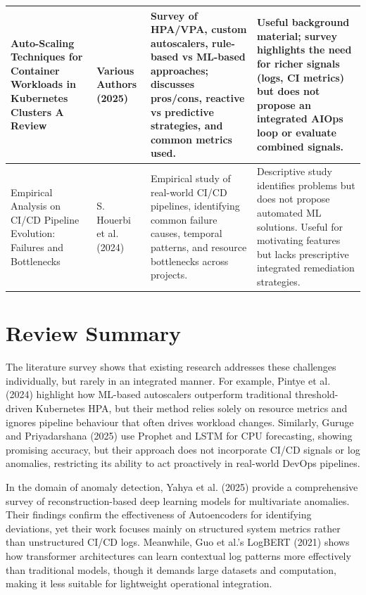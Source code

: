 \documentclass[12pt]{report}
\begin{document}
\begin{longtable}{|p{3.9cm}|p{2.9cm}|p{4.0cm}|p{3.4cm}|}
Auto-Scaling Techniques for Container Workloads in Kubernetes Clusters A Review &
Various Authors (2025) &
Survey of HPA/VPA, custom autoscalers, rule-based vs ML-based approaches; discusses pros/cons, reactive vs predictive strategies, and common metrics used. &
Useful background material; survey highlights the need for richer signals (logs, CI metrics) but does not propose an integrated AIOps loop or evaluate combined signals. \\
\hline

Empirical Analysis on CI/CD Pipeline Evolution: Failures and Bottlenecks &
S. Houerbi et al. (2024) &
Empirical study of real-world CI/CD pipelines, identifying common failure causes, temporal patterns, and resource bottlenecks across projects. &
Descriptive study identifies problems but does not propose automated ML solutions. Useful for motivating features but lacks prescriptive integrated remediation strategies. \\
\hline


\end{longtable}


\section{Review Summary}

The literature survey shows that existing research addresses these challenges individually, but rarely in an integrated manner. For example, Pintye et al. (2024) highlight how ML-based autoscalers outperform traditional threshold-driven Kubernetes HPA, but their method relies solely on resource metrics and ignores pipeline behaviour that often drives workload changes. Similarly, Guruge and Priyadarshana (2025) use Prophet and LSTM for CPU forecasting, showing promising accuracy, but their approach does not incorporate CI/CD signals or log anomalies, restricting its ability to act proactively in real-world DevOps pipelines.

In the domain of anomaly detection, Yahya et al. (2025) provide a comprehensive survey of reconstruction-based deep learning models for multivariate anomalies. Their findings confirm the effectiveness of Autoencoders for identifying deviations, yet their work focuses mainly on structured system metrics rather than unstructured CI/CD logs. Meanwhile, Guo et al.'s LogBERT (2021) shows how transformer architectures can learn contextual log patterns more effectively than traditional models, though it demands large datasets and computation, making it less suitable for lightweight operational integration.
\end{document}
